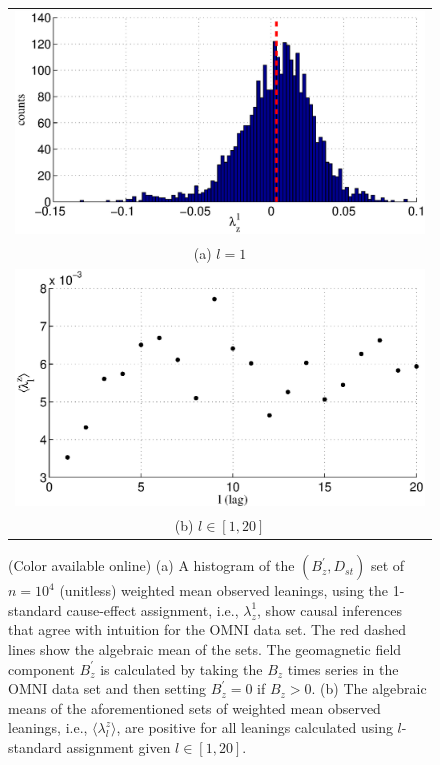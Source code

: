\documentclass[twocolumn,aps,pre,groupedaddress]{revtex4-1}
\begin{document}
\begin{figure}[ht]
\begin{tabular}{c}
\includegraphics[scale=0.40]{SolarDataBzNormDst.eps} \\ 
(a) $l=1$\\
\includegraphics[scale=0.40]{SolarDataBzNormDst_difflags.eps} \\ 
(b) $l\in[1,20]$
\end{tabular}
\caption{(Color available online) (a) A histogram of the $(B_z^\prime,D_{st})$ set of $n=10^4$ (unitless) weighted mean observed leanings, using the 1-standard cause-effect assignment, i.e., $\lambda^1_{z}$, show causal inferences that agree with intuition for the OMNI data set.  The red dashed lines show the algebraic mean of the sets.  The geomagnetic field component $B_z^\prime$ is calculated by taking the $B_z$ times series in the OMNI data set and then setting $B_z^\prime = 0$ if $B_z>0$. (b) The algebraic means of the aforementioned sets of weighted mean observed leanings, i.e., $\langle\lambda^z_l\rangle$, are positive for all leanings calculated using $l$-standard assignment given $l\in[1,20]$.}
\label{fig:dsthist}
\end{figure}
\end{document}
